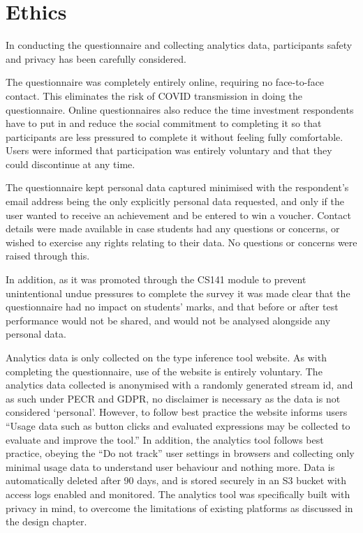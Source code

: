 \documentclass[a4paper,fleqn,oneside,12pt]{report}
\begin{document}
\section{Ethics}\label{id:h.q5st3bb4afm1}
In conducting the questionnaire and collecting analytics data, participants safety and privacy has been carefully considered.

The questionnaire was completely entirely online, requiring no face-to-face contact. This eliminates the risk of COVID transmission in doing the questionnaire. Online questionnaires also reduce the time investment respondents have to put in and reduce the social commitment to completing it so that participants are less pressured to complete it without feeling fully comfortable. Users were informed that participation was entirely voluntary and that they could discontinue at any time.

The questionnaire kept personal data captured minimised with the respondent’s email address being the only explicitly personal data requested, and only if the user wanted to receive an achievement and be entered to win a voucher. Contact details were made available in case students had any questions or concerns, or wished to exercise any rights relating to their data. No questions or concerns were raised through this.

In addition, as it was promoted through the CS141 module to prevent unintentional undue pressures to complete the survey it was made clear that the questionnaire had no impact on students’ marks, and that before or after test performance would not be shared, and would not be analysed alongside any personal data.

Analytics data is only collected on the type inference tool website. As with completing the questionnaire, use of the website is entirely voluntary. The analytics data collected is anonymised with a randomly generated stream id, and as such under PECR and GDPR, no disclaimer is necessary as the data is not considered ‘personal’. However, to follow best practice the website informs users “Usage data such as button clicks and evaluated expressions may be collected to evaluate and improve the tool.” In addition, the analytics tool follows best practice, obeying the “Do not track” user settings in browsers and collecting only minimal usage data to understand user behaviour and nothing more. Data is automatically deleted after 90 days, and is stored securely in an S3 bucket with access logs enabled and monitored. The analytics tool was specifically built with privacy in mind, to overcome the limitations of existing platforms as discussed in the design chapter.
\end{document}
